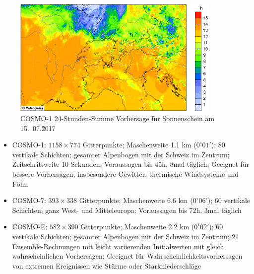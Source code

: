 \begin{refsection}
\begin{figure}
\centering
\includegraphics[width=0.9\textwidth]{klima/cosmo1.png}
\caption{COSMO-1 24-Stunden-Summe Vorhersage für Sonnenschein am
15.~07.\~2017 \cite{klima:meteoschweiz}
\label{klima:wettervorhersagen:cosmo}}
\end{figure}

\begin{itemize}
\item COSMO-1: $1158 \times 774$ Gitterpunkte; Maschenweite 1.1 km
($0^\circ 01'$); 80 vertikale Schichten; gesamter Alpenbogen mit der Schweiz
im Zentrum; Zeitschrittweite 10 Sekunden; Voraussagen bis 45h, 8mal
täglich; Geeignet für bessere Vorhersagen, insbesondere Gewitter,
thermische Windsysteme und Föhn \cite{klima:meteoschweiz}
\item COSMO-7: $393 \times 338$ Gitterpunkte; Maschenweite 6.6 km
($0^\circ 06'$); 60 vertikale Schichten; ganz West- und Mitteleuropa;
Voraussagen bis 72h, 3mal täglich \cite{klima:meteoschweiz}
\item COSMO-E: $582 \times 390$ Gitterpunkte; Maschenweite 2.2 km
($0^\circ  02'$); 60 vertikale Schichten; gesamter Alpenbogen mit der Schweiz
im Zentrum; 21 Ensemble-Rechnungen mit leicht variierenden Initialwerten
mit gleich wahrscheinlichen Vorhersagen; Geeignet für
Wahrscheinlichkeitsvorhersagen von extremen Ereignissen wie Stürme
oder Starkniederschläge \cite{klima:meteoschweiz}
\end{itemize}


\end{refsection}
